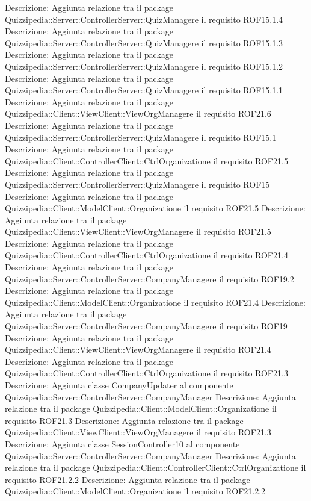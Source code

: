Descrizione: Aggiunta relazione tra il package Quizzipedia::Server::ControllerServer::QuizManagere il requisito ROF15.1.4 
Descrizione: Aggiunta relazione tra il package Quizzipedia::Server::ControllerServer::QuizManagere il requisito ROF15.1.3 
Descrizione: Aggiunta relazione tra il package Quizzipedia::Server::ControllerServer::QuizManagere il requisito ROF15.1.2 
Descrizione: Aggiunta relazione tra il package Quizzipedia::Server::ControllerServer::QuizManagere il requisito ROF15.1.1 
Descrizione: Aggiunta relazione tra il package Quizzipedia::Client::ViewClient::ViewOrgManagere il requisito ROF21.6 
Descrizione: Aggiunta relazione tra il package Quizzipedia::Server::ControllerServer::QuizManagere il requisito ROF15.1 
Descrizione: Aggiunta relazione tra il package Quizzipedia::Client::ControllerClient::CtrlOrganizatione il requisito ROF21.5 
Descrizione: Aggiunta relazione tra il package Quizzipedia::Server::ControllerServer::QuizManagere il requisito ROF15 
Descrizione: Aggiunta relazione tra il package Quizzipedia::Client::ModelClient::Organizatione il requisito ROF21.5 
Descrizione: Aggiunta relazione tra il package Quizzipedia::Client::ViewClient::ViewOrgManagere il requisito ROF21.5 
Descrizione: Aggiunta relazione tra il package Quizzipedia::Client::ControllerClient::CtrlOrganizatione il requisito ROF21.4 
Descrizione: Aggiunta relazione tra il package Quizzipedia::Server::ControllerServer::CompanyManagere il requisito ROF19.2 
Descrizione: Aggiunta relazione tra il package Quizzipedia::Client::ModelClient::Organizatione il requisito ROF21.4 
Descrizione: Aggiunta relazione tra il package Quizzipedia::Server::ControllerServer::CompanyManagere il requisito ROF19 
Descrizione: Aggiunta relazione tra il package Quizzipedia::Client::ViewClient::ViewOrgManagere il requisito ROF21.4 
Descrizione: Aggiunta relazione tra il package Quizzipedia::Client::ControllerClient::CtrlOrganizatione il requisito ROF21.3 
Descrizione: Aggiunta classe CompanyUpdater al componente Quizzipedia::Server::ControllerServer::CompanyManager 
Descrizione: Aggiunta relazione tra il package Quizzipedia::Client::ModelClient::Organizatione il requisito ROF21.3 
Descrizione: Aggiunta relazione tra il package Quizzipedia::Client::ViewClient::ViewOrgManagere il requisito ROF21.3 
Descrizione: Aggiunta classe SessionController10 al componente Quizzipedia::Server::ControllerServer::CompanyManager 
Descrizione: Aggiunta relazione tra il package Quizzipedia::Client::ControllerClient::CtrlOrganizatione il requisito ROF21.2.2 
Descrizione: Aggiunta relazione tra il package Quizzipedia::Client::ModelClient::Organizatione il requisito ROF21.2.2 
